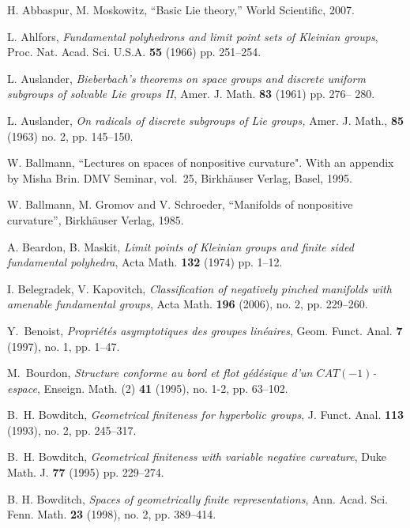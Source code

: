 \documentclass[12pt]{article}
\theoremstyle{boldplain}
\theoremstyle{bolddefinition}
\numberwithin{equation}{section}
\begin{document}
\begin{thebibliography}{BLP05}

H. Abbaspur, M. Moskowitz,  ``Basic Lie theory,'' World Scientific, 2007.  

L. Ahlfors,  {\em Fundamental polyhedrons and limit point sets of Kleinian groups}, 
Proc. Nat. Acad. Sci. U.S.A. {\bf 55} (1966) pp. 251--254.


L. Auslander, {\em Bieberbach's theorems on space groups and discrete uniform subgroups of solvable Lie groups II}, Amer. J. Math. {\bf 83} (1961) pp. 276-- 280.

L. Auslander, {\em On radicals of discrete subgroups of Lie groups,} Amer. J. Math., {\bf 85} (1963) no. 2,  pp. 145--150.

W. Ballmann,
``Lectures on spaces of nonpositive curvature". With an appendix by Misha Brin. 
DMV Seminar, vol.\ 25, Birkh\"auser Verlag, Basel, 1995.

W. Ballmann, M. Gromov and V. Schroeder, ``Manifolds of nonpositive curvature'', Birkh\"auser Verlag, 1985. 



A. Beardon, B. Maskit, 
{\em Limit points of Kleinian groups and finite sided fundamental polyhedra},  
Acta Math. {\bf 132} (1974) pp. 1--12. 


I. Belegradek, V. Kapovitch, 
{\em Classification of negatively pinched manifolds with amenable fundamental groups},  
Acta Math. {\bf 196} (2006), no. 2, pp. 229--260. 

Y.\ Benoist,
{\em Propri\'et\'es asymptotiques des groupes lin\'eaires}, Geom. Funct. Anal.  {\bf 7} (1997), no. 1, pp. 1--47.



M.\ Bourdon,
{\em Structure conforme au bord et flot g\'ed\'esique d'un $CAT(-1)$-espace},
Enseign. Math. (2) {\bf 41} (1995), no. 1-2, pp. 63--102. 

B.\ H. Bowditch,  {\em Geometrical finiteness for hyperbolic groups}, J. Funct. Anal. {\bf 113} (1993), no. 2, pp. 245--317.


B.\ H. Bowditch, {\em Geometrical finiteness with variable negative curvature},
Duke Math. J.  {\bf 77} (1995) pp. 229--274.

B. H. Bowditch, {\em  Spaces of geometrically finite representations}, 
Ann. Acad. Sci. Fenn. Math. {\bf 23} (1998), no. 2, pp. 389--414.
 

\end{thebibliography}
\end{document}
